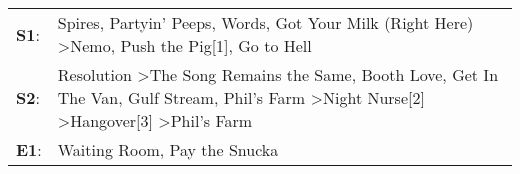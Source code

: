 \begin{supertabular}{p{0.03\textwidth}p{0.92\textwidth}}
 \textbf{S1}:  &                                                                                                                                     Spires\textsuperscript{}, \enspace Partyin' Peeps\textsuperscript{}, \enspace Words\textsuperscript{}, \enspace Got Your Milk (Right Here)\textsuperscript{} \textgreater \enspace Nemo\textsuperscript{}, \enspace Push the Pig[1]\textsuperscript{}, \enspace Go to Hell\textsuperscript{}  \enspace  \\
 \textbf{S2}:  &  Resolution\textsuperscript{} \textgreater \enspace The Song Remains the Same\textsuperscript{}, \enspace Booth Love\textsuperscript{}, \enspace Get In The Van\textsuperscript{}, \enspace Gulf Stream\textsuperscript{}, \enspace Phil's Farm\textsuperscript{} \textgreater \enspace Night Nurse[2]\textsuperscript{} \textgreater \enspace Hangover[3]\textsuperscript{} \textgreater \enspace Phil's Farm\textsuperscript{}  \enspace  \\
 \textbf{E1}:  &                                                                                                                                                                                                                                                                                                                                                        Waiting Room\textsuperscript{}, \enspace Pay the Snucka\textsuperscript{}  \enspace  \\
\end{supertabular}
